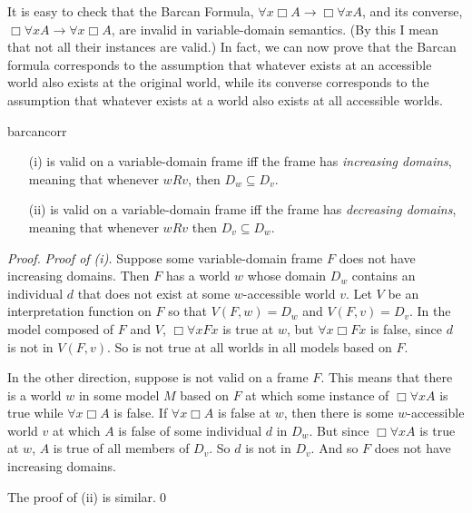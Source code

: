 It is easy to check that the Barcan Formula,
$\forall x \Box A \to \Box \forall x A$, and its converse,
$\Box \forall x A \to \forall x \Box A$, are invalid in variable-domain
semantics. (By this I mean that not all their instances are valid.) In fact, we
can now prove that the Barcan formula corresponds to the assumption that
whatever exists at an accessible world also exists at the original world, while
its converse corresponds to the assumption that whatever exists at a world also
exists at all accessible worlds.

\begin{observation}{barcancorr}
  \vspace{-1mm}
  \begin{enumerate}[leftmargin=10mm]
    \itemsep0mm
  \item[(i)]  is valid on a variable-domain frame iff the frame has
    \emph{increasing domains}, meaning that whenever $wRv$, then
    $D_w \subseteq D_v$.
    
  \item[(ii)]  is valid on a variable-domain frame iff the frame has
    \emph{decreasing domains}, meaning that whenever $wRv$ then
    $D_v \subseteq D_w$.
  \end{enumerate}
  \vspace{-2mm}
\end{observation}
%
\begin{proof}
  \emph{Proof of (i).} Suppose some variable-domain frame $F$ does not have
  increasing domains. Then $F$ has a world $w$ whose domain $D_w$ contains an
  individual $d$ that does not exist at some $w$-accessible world $v$. Let $V$
  be an interpretation function on $F$ so that $V(F,w) = D_w$ and
  $V(F,v) = D_v$. In the model composed of $F$ and $V$, $\Box \forall x Fx$ is
  true at $w$, but $\forall x \Box Fx$ is false, since $d$ is not in $V(F,v)$.
  So  is not true at all worlds in all models based on $F$.

  In the other direction, suppose  is not valid on a frame $F$. This
  means that there is a world $w$ in some model $M$ based on $F$ at which some
  instance of $\Box \forall x A$ is true while $\forall x \Box A$ is false. If
  $\forall x \Box A$ is false at $w$, then there is some $w$-accessible world
  $v$ at which $A$ is false of some individual $d$ in $D_w$. But since
  $\Box \forall x A$ is true at $w$, $A$ is true of all members of $D_v$. So $d$
  is not in $D_v$. And so $F$ does not have increasing domains.

  The proof of (ii) is similar.\qed
  
\end{proof}


